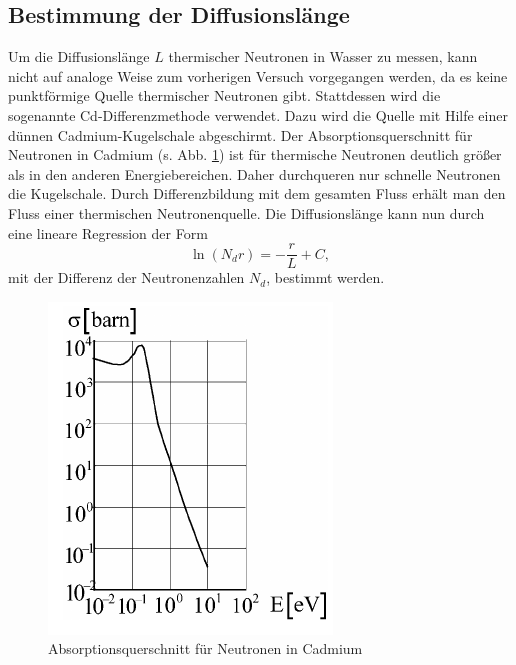 \subsection{Bestimmung der Diffusionslänge}

Um die Diffusionslänge $L$ thermischer Neutronen in Wasser zu messen, kann nicht auf analoge Weise zum vorherigen Versuch vorgegangen werden, da es keine punktförmige Quelle thermischer Neutronen gibt.
Stattdessen wird die sogenannte Cd-Differenzmethode verwendet. Dazu wird die Quelle mit Hilfe einer dünnen Cadmium-Kugelschale abgeschirmt. Der Absorptionsquerschnitt für Neutronen in Cadmium (s. Abb. \ref{fig:cd}) ist für thermische Neutronen deutlich größer als in den anderen Energiebereichen. Daher durchqueren nur schnelle Neutronen die Kugelschale.
Durch Differenzbildung mit dem gesamten Fluss erhält man den Fluss einer thermischen Neutronenquelle. Die Diffusionslänge kann nun durch eine lineare Regression der Form
\begin{equation}
 \ln\left(N_{d}r\right) = -\frac{r}{L} + C,
\end{equation}
mit der Differenz der Neutronenzahlen $N_{d}$, bestimmt werden.

\begin{figure}[h]
  \centering
  \includegraphics[scale=1.0]{./fig/cd_wirkungsquerschnitt.png}
  \caption{Absorptionsquerschnitt für Neutronen in Cadmium \cite{BB}}
  \label{fig:cd}
\end{figure}